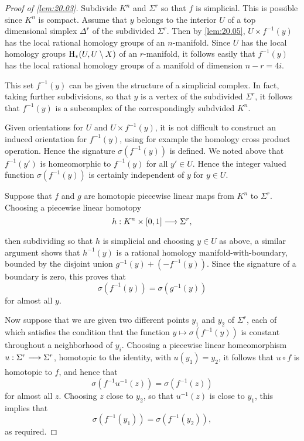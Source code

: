 \documentclass[../main]{subfiles}
\begin{document}
\begin{proof}[Proof of \ref{lem:20.03}]
Subdivide $K^n$ and $\Sigma^r$ so that $f$ is simplicial. This is possible since $K^n$ is compact. Assume that $y$ belongs to the interior $U$ of a top dimensional simplex $\Delta^r$ of the subdivided $\Sigma^r$. Then by \ref{lem:20.05}, $U \times f^{-1}(y)$ has the local rational homology groups of an $n$-manifold. Since $U$ has the local homology groups $\operatorname{H}_\ast(U,U\setminus X)$ of an $r$-manifold, it follows easily that $f^{-1}(y)$ has the local rational homology groups of a manifold of dimension $n-r = 4i$.

This set $f^{-1}(y)$ can be given the structure of a simplicial complex. In fact, taking further subdivisions, so that $y$ is a vertex of the subdivided $\Sigma^r$, it follows that $f^{-1}(y)$ is a subcomplex of the correspondingly subdvided $K^n$.

Given orientations for $U$ and $U \times f^{-1}(y)$, it is not difficult to construct an induced orientation for $f^{-1}(y)$, using for example the homology cross product operation. Hence the signature $\sigma(f^{-1}(y))$ is defined. We noted above that $f^{-1}(y')$ is homeomorphic to $f^{-1}(y)$ for all $y' \in U$. Hence the integer valued function $\sigma(f^{-1}(y))$ is certainly independent of $y$ for $y \in U$.

Suppose that $f$ and $g$ are homotopic piecewise linear maps from $K^n$ to $\Sigma^r$. Choosing a piecewise linear homotopy \[h:K^n \times [0,1] \varrightarrow{} \Sigma^r,\] then subdividing so that $h$ is simplicial and choosing $y \in U$ as above, a similar argument shows that $h^{-1}(y)$ is a rational homology manifold-with-boundary, bounded by the disjoint union $g^{-1}(y) + (-f^{-1}(y))$. Since the signature of a boundary is zero, this proves that \[\sigma(f^{-1}(y)) = \sigma(g^{-1}(y)) \] for almost all $y$.

Now suppose that we are given two different points $y_1$ and $y_2$ of $\Sigma^r$, each of which satisfies the condition that the function $y \mapsto \sigma(f^{-1}(y))$ is constant throughout a neighborhood of $y_i$. Choosing a piecewise linear homeomorphism $u:\Sigma^r \varrightarrow{} \Sigma^r$, homotopic to the identity, with $u(y_1) = y_2$, it follows that $u \circ f$ is homotopic to $f$, and hence that \[\sigma(f^{-1} u^{-1}(z)) = \sigma(f^{-1}(z))\] for almost all $z$. Choosing $z$ close to $y_2$, so that $u^{-1}(z)$ is close to $y_1$, this implies that \[\sigma(f^{-1}(y_1)) = \sigma(f^{-1}(y_2)),\] as required.
\end{proof}
\end{document}

